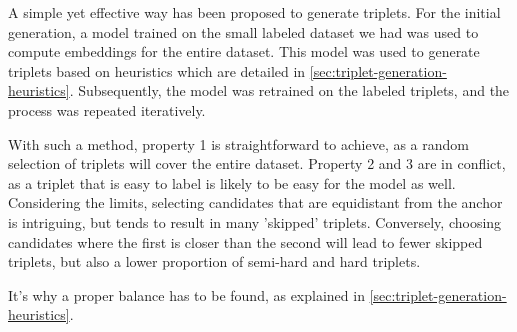 A simple yet effective way has been proposed to generate triplets. For the initial generation, a model trained on the small labeled dataset we had was used to compute embeddings for the entire dataset. This model was used to generate triplets based on heuristics which are detailed in \autoref{sec:triplet-generation-heuristics}. Subsequently, the model was retrained on the labeled triplets, and the process was repeated iteratively.

With such a method, property 1 is straightforward to achieve, as a random selection of triplets will cover the entire dataset. Property 2 and 3 are in conflict, as a triplet that is easy to label is likely to be easy for the model as well. Considering the limits, selecting candidates that are equidistant from the anchor is intriguing, but tends to result in many 'skipped' triplets. Conversely, choosing candidates where the first is closer than the second will lead to fewer skipped triplets, but also a lower proportion of semi-hard and hard triplets.

It's why a proper balance has to be found, as explained in \autoref{sec:triplet-generation-heuristics}.

